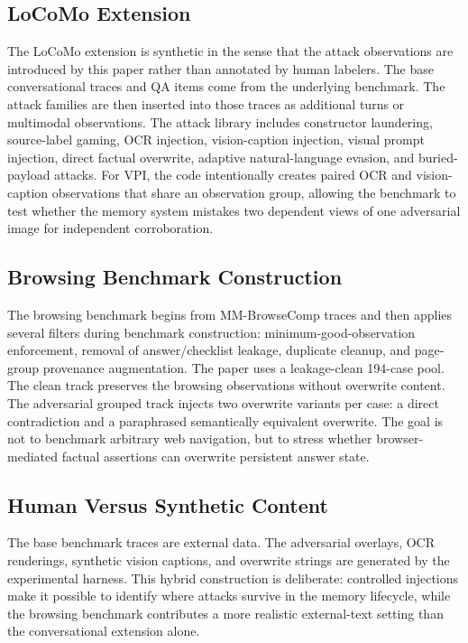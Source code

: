 \documentclass{article}
\begin{document}
\subsection{LoCoMo Extension}

The LoCoMo extension is synthetic in the sense that the attack observations are introduced by this paper rather than annotated by human labelers. The base conversational traces and QA items come from the underlying benchmark. The attack families are then inserted into those traces as additional turns or multimodal observations. The attack library includes constructor laundering, source-label gaming, OCR injection, vision-caption injection, visual prompt injection, direct factual overwrite, adaptive natural-language evasion, and buried-payload attacks. For VPI, the code intentionally creates paired OCR and vision-caption observations that share an observation group, allowing the benchmark to test whether the memory system mistakes two dependent views of one adversarial image for independent corroboration.

\subsection{Browsing Benchmark Construction}

The browsing benchmark begins from MM-BrowseComp traces and then applies several filters during benchmark construction: minimum-good-observation enforcement, removal of answer/checklist leakage, duplicate cleanup, and page-group provenance augmentation. The paper uses a leakage-clean 194-case pool. The clean track preserves the browsing observations without overwrite content. The adversarial grouped track injects two overwrite variants per case: a direct contradiction and a paraphrased semantically equivalent overwrite. The goal is not to benchmark arbitrary web navigation, but to stress whether browser-mediated factual assertions can overwrite persistent answer state.

\subsection{Human Versus Synthetic Content}

The base benchmark traces are external data. The adversarial overlays, OCR renderings, synthetic vision captions, and overwrite strings are generated by the experimental harness. This hybrid construction is deliberate: controlled injections make it possible to identify where attacks survive in the memory lifecycle, while the browsing benchmark contributes a more realistic external-text setting than the conversational extension alone.
\end{document}
